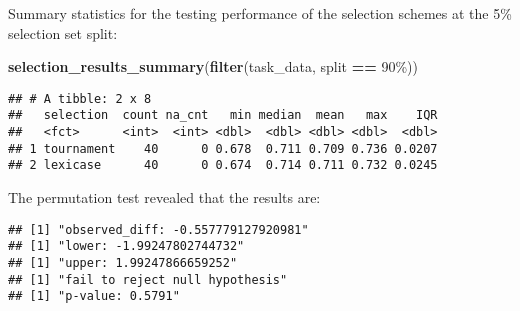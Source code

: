 \documentclass[
]{book}
\newenvironment{Shaded}{\begin{snugshade}}{\end{snugshade}}
\newcommand{\AttributeTok}[1]{\textcolor[rgb]{0.13,0.29,0.53}{#1}}
\newcommand{\DecValTok}[1]{\textcolor[rgb]{0.00,0.00,0.81}{#1}}
\newcommand{\FunctionTok}[1]{\textcolor[rgb]{0.13,0.29,0.53}{\textbf{#1}}}
\newcommand{\NormalTok}[1]{#1}
\newcommand{\OtherTok}[1]{\textcolor[rgb]{0.56,0.35,0.01}{#1}}
\newcommand{\SpecialCharTok}[1]{\textcolor[rgb]{0.81,0.36,0.00}{\textbf{#1}}}
\newcommand{\StringTok}[1]{\textcolor[rgb]{0.31,0.60,0.02}{#1}}
\begin{document}
Summary statistics for the testing performance of the selection schemes at the 5\% selection set split:

\begin{Shaded}
\begin{Highlighting}[]
\FunctionTok{selection\_results\_summary}\NormalTok{(}\FunctionTok{filter}\NormalTok{(task\_data, split }\SpecialCharTok{==} \StringTok{\textquotesingle{}90\%\textquotesingle{}}\NormalTok{))}
\end{Highlighting}
\end{Shaded}

\begin{verbatim}
## # A tibble: 2 x 8
##   selection  count na_cnt   min median  mean   max    IQR
##   <fct>      <int>  <int> <dbl>  <dbl> <dbl> <dbl>  <dbl>
## 1 tournament    40      0 0.678  0.711 0.709 0.736 0.0207
## 2 lexicase      40      0 0.674  0.714 0.711 0.732 0.0245
\end{verbatim}

The permutation test revealed that the results are:

\begin{Shaded}
\end{Shaded}

\begin{verbatim}
## [1] "observed_diff: -0.557779127920981"
## [1] "lower: -1.99247802744732"
## [1] "upper: 1.99247866659252"
## [1] "fail to reject null hypothesis"
## [1] "p-value: 0.5791"
\end{verbatim}
\end{document}

